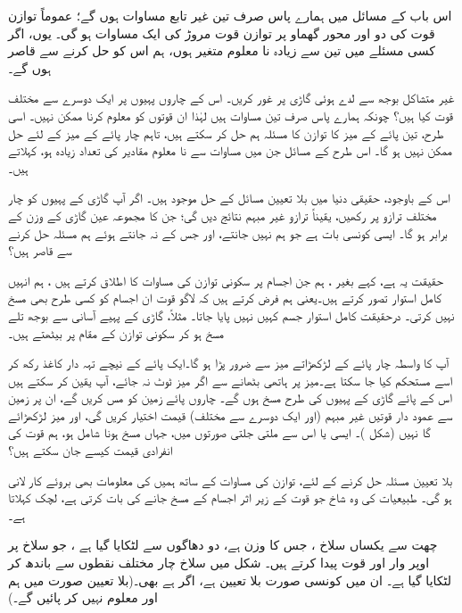اس باب کے مسائل  میں  ہمارے پاس صرف  تین غیر تابع مساوات  ہوں گے؛  عموماً  توازن قوت  کی  دو اور محور گھماو پر  توازن قوت مروڑ  کی  ایک مساوات ہو گی۔ یوں، اگر کسی مسئلے میں تین سے زیادہ نا معلوم متغیر ہوں، ہم اس کو حل کرنے سے قاصر ہوں گے۔

غیر  متشاکل بوجھ سے لدے ہوئی گاڑی پر غور کریں۔ اس کے چاروں پہیوں پر ایک دوسرے سے مختلف   قوت کیا ہیں؟ چونکہ ہمارے پاس صرف تین مساوات ہیں لہٰذا ان قوتوں کو معلوم کرنا ممکن نہیں۔ اسی طرح، تین پائے کے  میز  کا توازن کا مسئلہ  ہم حل کر سکتے ہیں، تاہم چار پائے کے میز کے لئے  حل ممکن نہیں ہو گا۔ اس طرح کے مسائل جن میں مساوات سے نا معلوم مقادیر  کی تعداد زیادہ ہو، کہلاتے ہیں۔

اس کے باوجود، حقیقی دنیا میں بلا تعیین مسائل کے حل موجود ہیں۔ اگر آپ گاڑی کے پہیوں کو چار مختلف ترازو پر رکھیں، یقیناً ترازو  غیر مبہم نتائج دیں گی؛ جن کا مجموعہ عین گاڑی کے وزن کے برابر ہو گا۔ ایسی کونسی بات ہے جو ہم نہیں جانتے، اور جس کے نہ جانتے ہوئے ہم مسئلہ حل کرنے سے قاصر ہیں؟

حقیقت یہ ہے، کہے بغیر ، ہم جن اجسام پر سکونی  توازن  کی مساوات کا اطلاق  کرتے ہیں ، ہم انہیں  کامل  استوار  تصور کرتے ہیں۔یعنی ہم فرض کرتے ہیں کہ لاگو قوت ان اجسام کو کسی طرح بھی  مسخ نہیں   کرتی۔ درحقیقت کامل استوار جسم کہیں نہیں پایا جاتا۔ مثلاً، گاڑی کے پہیے آسانی سے بوجھ تلے مسخ ہو کر  سکونی  توازن  کے مقام پر بیٹھتے ہیں۔

آپ کا واسطہ چار پائے کے لڑکھڑاتے  میز  سے ضرور پڑا ہو گا۔ایک پائے کے نیچے  تہہ دار کاغذ  رکھ کر اسے مستحکم کیا جا سکتا ہے۔میز پر  ہاتھی  بٹھانے سے اگر میز ٹوٹ نہ جائے، آپ یقین کر سکتے ہیں اس کے پائے گاڑی کے پہیوں کی طرح مسخ ہوں گے۔  چاروں پائے زمین کو مس کریں گے، ان پر زمین سے عمود دار قوتیں  غیر مبہم   (اور ایک دوسرے سے مختلف) قیمت اختیار کریں گی، اور  میز لڑکھڑائے گا نہیں (شکل )۔ ایسی  یا اس سے ملتی جلتی  صورتوں میں، جہاں  مسخ ہونا شامل ہو،  ہم  قوت  کی انفرادی قیمت کیسے جان سکتے ہیں؟

 بلا تعیین مسئلہ حل کرنے کے لئے، توازن کی مساوات کے ساتھ ہمیں  کی معلومات  بھی بروئے کار لانی ہو گی۔  طبیعیات کی وہ شاخ جو قوت کے زیر اثر اجسام کے مسخ جانے  کی بات کرتی ہے، لچک کہلاتا ہے۔
 
 چھت سے یکساں سلاخ ، جس کا وزن  ہے، دو  دھاگوں  سے لٹکایا گیا ہے ، جو سلاخ پر اوپر وار  اور  قوت  پیدا کرتے  ہیں۔ شکل  میں سلاخ  چار مختلف  نقطوں  سے باندھ کر لٹکایا گیا ہے۔ ان میں کونسی صورت  بلا تعیین ہے، اگر ہے بھی۔(بلا تعیین صورت 
 میں ہم  اور  معلوم نہیں کر پائیں گے۔)
 
